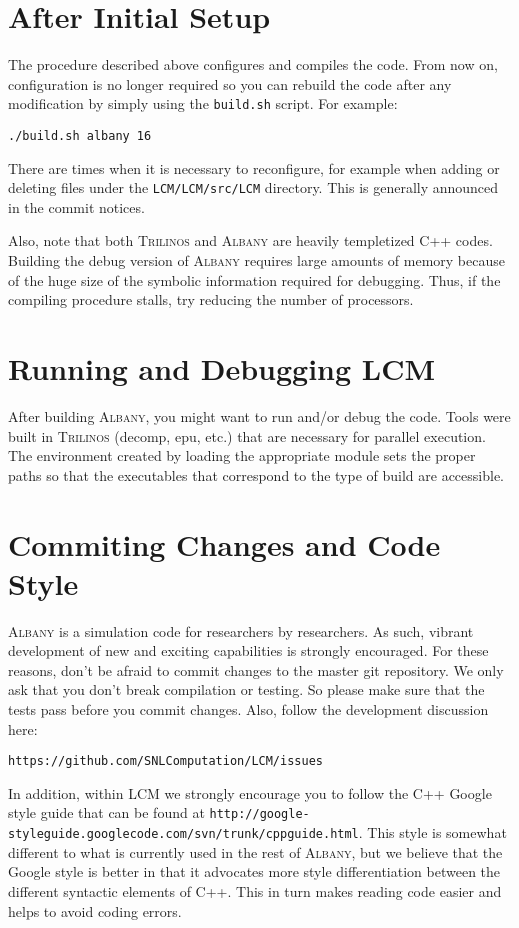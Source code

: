 \documentclass{article}
\newcommand{\trilinos}{\textsc{Trilinos}}
\newcommand{\albany}{\textsc{Albany}}
\newcommand{\lcm}{\textsc{LCM}}
\begin{document}
\section{After Initial Setup}
The procedure described above configures and compiles the code. From
now on, configuration is no longer required so you can rebuild the
code after any modification by simply using the \verb+build.sh+
script. For example:
\begin{verbatim}
./build.sh albany 16
\end{verbatim}
There are times when it is necessary to reconfigure, for example when
adding or deleting files under the \verb+LCM/LCM/src/LCM+
directory. This is generally announced in the commit notices.

Also, note that both \trilinos{} and \albany{} are heavily templetized
C++ codes. Building the debug version of \albany{} requires large
amounts of memory because of the huge size of the symbolic information
required for debugging. Thus, if the compiling procedure stalls, try
reducing the number of processors.

\section{Running and Debugging \lcm{}} 

After building \albany{}, you might want to run and/or debug the code.
Tools were built in \trilinos{} (decomp, epu, etc.) that are necessary
for parallel execution. The environment created by loading the
appropriate module sets the proper paths so that the executables that
correspond to the type of build are accessible.

\section{Commiting Changes and Code Style}
\albany{} is a simulation code for researchers by researchers. As
such, vibrant development of new and exciting capabilities is strongly
encouraged. For these reasons, don't be afraid to commit changes to
the master git repository. We only ask that you don't break
compilation or testing. So please make sure that the tests pass before
you commit changes. Also, follow the development discussion here:
\begin{verbatim}
https://github.com/SNLComputation/LCM/issues
\end{verbatim}

In addition, within \lcm{} we strongly encourage you to follow the C++
Google style guide that can be found at
\verb+http://google-styleguide.googlecode.com/svn/trunk/cppguide.html+.
This style is somewhat different to what is currently used in the rest
of \albany{}, but we believe that the Google style is better in that
it advocates more style differentiation between the different
syntactic elements of C++. This in turn makes reading code easier and
helps to avoid coding errors.
\end{document}
